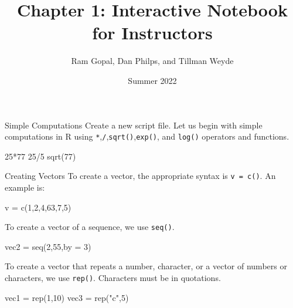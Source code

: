 \documentclass[
  ignorenonframetext,
]{beamer}
\title{Chapter 1: Interactive Notebook for Instructors}
\author{Ram Gopal, Dan Philps, and Tillman Weyde}
\date{Summer 2022}
\newenvironment{Shaded}{\begin{snugshade}}{\end{snugshade}}
\newcommand{\AttributeTok}[1]{\textcolor[rgb]{0.77,0.63,0.00}{#1}}
\newcommand{\DecValTok}[1]{\textcolor[rgb]{0.00,0.00,0.81}{#1}}
\newcommand{\FunctionTok}[1]{\textcolor[rgb]{0.00,0.00,0.00}{#1}}
\newcommand{\NormalTok}[1]{#1}
\newcommand{\OtherTok}[1]{\textcolor[rgb]{0.56,0.35,0.01}{#1}}
\newcommand{\SpecialCharTok}[1]{\textcolor[rgb]{0.00,0.00,0.00}{#1}}
\newcommand{\StringTok}[1]{\textcolor[rgb]{0.31,0.60,0.02}{#1}}
\begin{document}
\frame{\titlepage}

\begin{frame}[fragile]{Simple Computations}
\protect\hypertarget{simple-computations}{}
Create a new script file. Let us begin with simple computations in R
using \texttt{*},\texttt{/},\texttt{sqrt()},\texttt{exp()}, and
\texttt{log()} operators and functions.

\begin{Shaded}
\begin{Highlighting}[]
\DecValTok{25}\SpecialCharTok{*}\DecValTok{77}  
\DecValTok{25}\SpecialCharTok{/}\DecValTok{5}  
\FunctionTok{sqrt}\NormalTok{(}\DecValTok{77}\NormalTok{)  }
\end{Highlighting}
\end{Shaded}
\end{frame}

\begin{frame}[fragile]{Creating Vectors}
\protect\hypertarget{creating-vectors}{}
To create a vector, the appropriate syntax is \texttt{v\ =\ c()}. An
example is:

\begin{Shaded}
\begin{Highlighting}[]
\NormalTok{v }\OtherTok{=} \FunctionTok{c}\NormalTok{(}\DecValTok{1}\NormalTok{,}\DecValTok{2}\NormalTok{,}\DecValTok{4}\NormalTok{,}\DecValTok{63}\NormalTok{,}\DecValTok{7}\NormalTok{,}\DecValTok{5}\NormalTok{)}
\end{Highlighting}
\end{Shaded}

To create a vector of a sequence, we use \texttt{seq()}.

\begin{Shaded}
\begin{Highlighting}[]
\NormalTok{vec2 }\OtherTok{=} \FunctionTok{seq}\NormalTok{(}\DecValTok{2}\NormalTok{,}\DecValTok{55}\NormalTok{,}\AttributeTok{by =} \DecValTok{3}\NormalTok{)}
\end{Highlighting}
\end{Shaded}

To create a vector that repeats a number, character, or a vector of
numbers or characters, we use \texttt{rep()}. Characters must be in
quotations.

\begin{Shaded}
\begin{Highlighting}[]
\NormalTok{vec1 }\OtherTok{=} \FunctionTok{rep}\NormalTok{(}\DecValTok{1}\NormalTok{,}\DecValTok{10}\NormalTok{)}
\NormalTok{vec3 }\OtherTok{=} \FunctionTok{rep}\NormalTok{(}\StringTok{"c"}\NormalTok{,}\DecValTok{5}\NormalTok{)}
\end{Highlighting}
\end{Shaded}
\end{frame}
\end{document}
